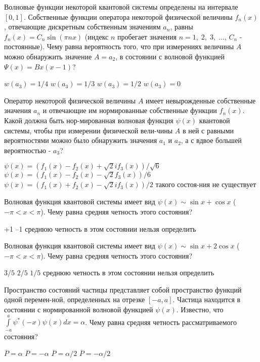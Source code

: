 \documentclass[11pt,a4paper]{exam}
\begin{document}
\begin{questions}
\question Волновые функции некоторой квантовой системы определены на интервале $[0,1]$. Собственные функции оператора некоторой физической величины ${f_n}(x)$, отвечающие дискретным собственным значениям ${a_n}$, равны ${f_n}(x) = {C_n}\sin (\pi nx)$ (индекс $n$ пробегает значения $n = 1,\;2,\;3,\;...$, ${C_n}$ - постоянные). Чему равна вероятность того, что при измерениях величины $A$ можно обнаружить значение $A = {a_2}$, в состоянии с волновой функцией $\Psi (x) = Bx(x - 1)$?
\begin{choices}
\choice $w({a_3}) = 1/4$      
\choice $w({a_3}) = 1/3$         
\choice $w({a_3}) = 1/2$      
\choice $w({a_3}) = 0$
\end{choices}

\question Оператор некоторой физической величины $A$ имеет невырожденные собственные значения ${a_n}$ и отвечающие им нормированные собственные функции ${f_n}(x)$. Какой должна быть нор-мированная волновая функция $\psi (x)$ квантовой системы, чтобы при измерении физической вели-чины $A$ в ней с равными вероятностями можно было обнаружить значения ${a_1}$ и ${a_2}$, а с вдвое большей вероятностью - ${a_3}$?
\begin{choices}
\choice $\psi (x) = \left( {{f_1}(x) - {f_2}(x) + \sqrt 2 i{f_3}(x)} \right)/\sqrt 6 $       
\choice $\psi (x) = \left( {{f_1}(x) - {f_2}(x) - \sqrt 2 {f_3}(x)} \right)/6$
\choice $\psi (x) = \left( {{f_1}(x) + {f_2}(x) - \sqrt 2 i{f_3}(x)} \right)/2$        
\choice такого состоя-ния не существует
\end{choices}

\question Волновая функция квантовой системы имеет вид $\psi (x) \sim \sin x + \cos x$ ($ - \pi  < x < \pi $). Чему равна средняя четность этого состояния?
\begin{choices}
\choice +1     
\choice –1     
\choice среднюю четность в этом состоянии нельзя определить
\end{choices}

\question Волновая функция квантовой системы имеет вид $\psi (x) \sim \sin x + 2\cos x$ ($ - \pi  < x < \pi $). Чему равна средняя четность этого состояния?
\begin{choices}
\choice $3/5$  
\choice $2/5$     
\choice $1/5$     
\choice среднюю четность в этом состоянии нельзя определить
\end{choices}

\question Пространство состояний частицы представляет собой пространство функций одной перемен-ной, определенных на отрезке $[ - a,a]$. Частица находится в состоянии с нормированной волновой функцией $\psi (x)$. Известно, что $\int\limits_{ - a}^a {{\psi ^*}( - x)\psi (x)dx = \alpha } $. Чему равна средняя четность рассматриваемого состояния?
\begin{choices}
\choice $\overline P  = \alpha $    
\choice $\overline P  =  - \alpha $    
\choice $\overline P  = \alpha /2$     
\choice $\overline P  =  - \alpha /2$
\end{choices}


\end{questions}
\end{document}
